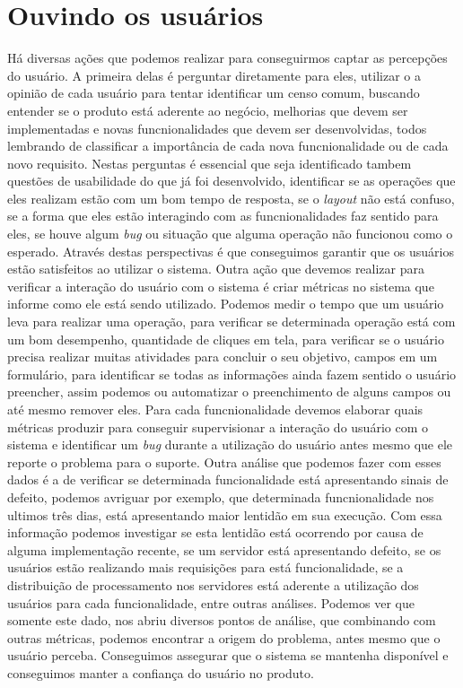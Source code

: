    \section{Ouvindo os usuários}
      Há diversas ações que podemos realizar para conseguirmos captar as percepções
      do usuário. A primeira delas é perguntar diretamente para eles, utilizar o
      a opinião de cada usuário para tentar identificar um censo comum, buscando
      entender se o produto está aderente ao negócio, melhorias que devem ser
      implementadas e novas funcnionalidades que devem ser desenvolvidas, todos
      lembrando de classificar a importância de cada nova funcnionalidade ou de
      cada novo requisito. Nestas perguntas é essencial que seja identificado tambem
      questões de usabilidade do que já foi desenvolvido, identificar se as
      operações que eles realizam estão com um bom tempo de resposta, se o
      \textit{layout} não está confuso, se a forma que eles estão interagindo com
      as funcnionalidades faz sentido para eles, se houve algum \textit{bug} ou
      situação que alguma operação não funcionou como o esperado. Através destas
      perspectivas é que conseguimos garantir que os usuários estão satisfeitos
      ao utilizar o sistema. \newline
      Outra ação que devemos realizar para verificar a interação do usuário com o
      sistema é criar métricas no sistema que informe como ele está sendo utilizado.
      Podemos medir o tempo que um usuário leva para realizar uma operação, para
      verificar se determinada operação está com um bom desempenho, quantidade de
      cliques em tela, para verificar se o usuário precisa realizar muitas atividades
      para concluir o seu objetivo, campos em um formulário, para identificar se
      todas as informações ainda fazem sentido o usuário preencher, assim podemos
      ou automatizar o preenchimento de alguns campos ou até mesmo remover eles.
      Para cada funcnionalidade devemos elaborar quais métricas produzir para
      conseguir supervisionar a interação do usuário com o sistema e identificar
      um \textit{bug} durante a utilização do usuário antes mesmo que ele reporte
      o problema para o suporte. Outra análise que podemos fazer com esses dados é
      a de verificar se determinada funcionalidade está apresentando sinais de
      defeito, podemos avriguar por exemplo, que determinada funcnionalidade nos
      ultimos três dias, está apresentando maior lentidão em sua execução. Com
      essa informação podemos investigar se esta lentidão está ocorrendo por causa
      de alguma implementação recente, se um servidor está apresentando defeito,
      se os usuários estão realizando mais requisições para está funcionalidade,
      se a distribuição de processamento nos servidores está aderente a utilização
      dos usuários para cada funcionalidade, entre outras análises. Podemos ver que
      somente este dado, nos abriu diversos pontos de análise, que combinando com
      outras métricas, podemos encontrar a origem do problema, antes mesmo que o
      usuário perceba. Conseguimos assegurar que o sistema se mantenha disponível
      e conseguimos manter a confiança do usuário no produto.

